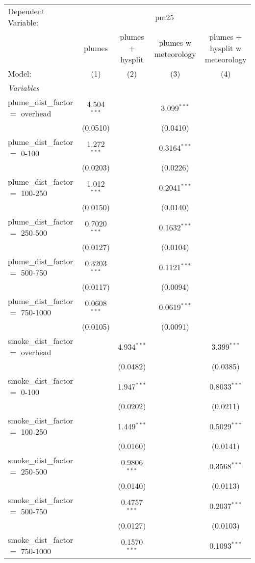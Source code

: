 
\begin{tabular}{lcccc}
\tabularnewline\midrule\midrule
Dependent Variable: & \multicolumn{4}{c}{pm25}\\
 & plumes & plumes + hysplit & plumes w meteorology & plumes + hysplit w meteorology \\ 
Model: & (1) & (2) & (3) & (4)\\
\midrule \emph{Variables} &   &   &   &  \\
plume\_dist\_factor $=$ overhead & 4.504$^{***}$ &    & 3.099$^{***}$ &   \\
  & (0.0510) &    & (0.0410) &   \\
plume\_dist\_factor $=$ 0-100 & 1.272$^{***}$ &    & 0.3164$^{***}$ &   \\
  & (0.0203) &    & (0.0226) &   \\
plume\_dist\_factor $=$ 100-250 & 1.012$^{***}$ &    & 0.2041$^{***}$ &   \\
  & (0.0150) &    & (0.0140) &   \\
plume\_dist\_factor $=$ 250-500 & 0.7020$^{***}$ &    & 0.1632$^{***}$ &   \\
  & (0.0127) &    & (0.0104) &   \\
plume\_dist\_factor $=$ 500-750 & 0.3203$^{***}$ &    & 0.1121$^{***}$ &   \\
  & (0.0117) &    & (0.0094) &   \\
plume\_dist\_factor $=$ 750-1000 & 0.0608$^{***}$ &    & 0.0619$^{***}$ &   \\
  & (0.0105) &    & (0.0091) &   \\
smoke\_dist\_factor $=$ overhead &    & 4.934$^{***}$ &    & 3.399$^{***}$\\
  &    & (0.0482) &    & (0.0385)\\
smoke\_dist\_factor $=$ 0-100 &    & 1.947$^{***}$ &    & 0.8033$^{***}$\\
  &    & (0.0202) &    & (0.0211)\\
smoke\_dist\_factor $=$ 100-250 &    & 1.449$^{***}$ &    & 0.5029$^{***}$\\
  &    & (0.0160) &    & (0.0141)\\
smoke\_dist\_factor $=$ 250-500 &    & 0.9806$^{***}$ &    & 0.3568$^{***}$\\
  &    & (0.0140) &    & (0.0113)\\
smoke\_dist\_factor $=$ 500-750 &    & 0.4757$^{***}$ &    & 0.2037$^{***}$\\
  &    & (0.0127) &    & (0.0103)\\
smoke\_dist\_factor $=$ 750-1000 &    & 0.1570$^{***}$ &    & 0.1093$^{***}$\\

\end{tabular}
